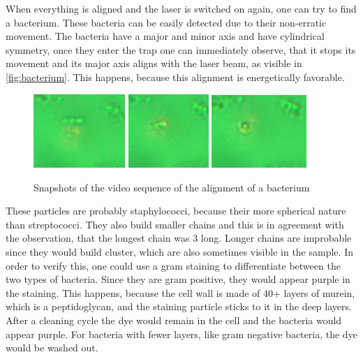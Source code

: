 \documentclass[12pt,english]{scrartcl}
\begin{document}
When everything is aligned and the laser is switched on again, one can try to
find a bacterium. These bacteria can be easily detected due to their
non-erratic movement. The bacteria have a major and minor axis and have
cylindrical symmetry, once they enter the trap one can immediately observe,
that it stops its movement and its major axis aligns with the laser beam, as
visible in \autoref{fig:bacterium}. This happens, because this alignment is
energetically favorable.

\begin{figure}[H]
	\centering
	\includegraphics[width=0.31\textwidth]{figures/lebewesen_1.JPG}
	\includegraphics[width=0.27\textwidth]{figures/lebewesen_2.JPG}
	\includegraphics[width=0.32\textwidth]{figures/lebewesen_3.JPG}
	\caption[Snapshots of the video sequence of the alignment of a bacterium
	]{Snapshots of the video sequence of the alignment of a bacterium
	}\label{fig:bacterium}
\end{figure}

These particles are probably staphylococci, because their more spherical nature
than streptococci. They also build smaller chains and this is in agreement with
the observation, that the longest chain was 3 long. Longer chains are
improbable since they would build cluster, which are also sometimes visible in
the sample.\cite{Bakterienformen} In order to verify this, one could use a gram
staining to differentiate between the two types of bacteria. Since they are
gram positive, they would appear purple in the staining. This happens, because
the cell wall is made of 40+ layers of murein, which is a peptidoglycan, and
the staining particle sticks to it in the deep layers. After a cleaning cycle
the dye would remain in the cell and the bacteria would appear purple. For
bacteria with fewer layers, like gram negative bacteria, the dye would be
washed out.\cite{ghazalMicrobiologicalHygenicDiscussion2024}
\end{document}
